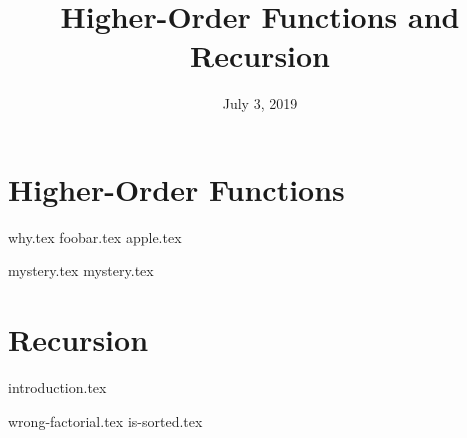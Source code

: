 \documentclass{exam}
\title{Higher-Order Functions and Recursion}
\date{July 3, 2019}
\begin{document}
\maketitle

\section{Higher-Order Functions}
\begin{questions}
{why.tex}
{foobar.tex}
{apple.tex}
\clearpage

{mystery.tex}
{mystery.tex}
\clearpage

\section{Recursion}
{introduction.tex}
\begin{questions}
{wrong-factorial.tex}
{is-sorted.tex}
\clearpage

\end{questions}
\end{questions}
\end{document}
